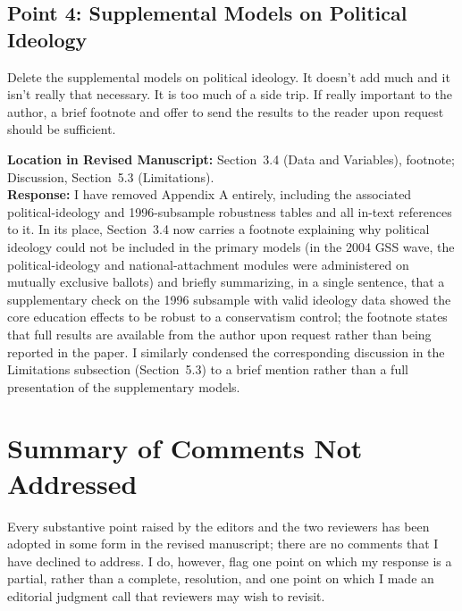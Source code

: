 \documentclass[11pt]{article}
\begin{document}
\subsection*{Point 4: Supplemental Models on Political Ideology}

\begin{reviewercomment}
Delete the supplemental models on political ideology. It doesn't add much and it isn't really that necessary. It is too much of a side trip. If really important to the author, a brief footnote and offer to send the results to the reader upon request should be sufficient.
\end{reviewercomment}

\noindent\textbf{Location in Revised Manuscript:} Section~3.4 (Data and Variables), footnote; Discussion, Section~5.3 (Limitations).\\[4pt]
\textbf{Response:} I have removed Appendix A entirely, including the associated political-ideology and 1996-subsample robustness tables and all in-text references to it. In its place, Section~3.4 now carries a footnote explaining why political ideology could not be included in the primary models (in the 2004 GSS wave, the political-ideology and national-attachment modules were administered on mutually exclusive ballots) and briefly summarizing, in a single sentence, that a supplementary check on the 1996 subsample with valid ideology data showed the core education effects to be robust to a conservatism control; the footnote states that full results are available from the author upon request rather than being reported in the paper. I similarly condensed the corresponding discussion in the Limitations subsection (Section~5.3) to a brief mention rather than a full presentation of the supplementary models.

\clearpage

\section*{Summary of Comments Not Addressed}

Every substantive point raised by the editors and the two reviewers has been adopted in some form in the revised manuscript; there are no comments that I have declined to address. I do, however, flag one point on which my response is a partial, rather than a complete, resolution, and one point on which I made an editorial judgment call that reviewers may wish to revisit.
\end{document}
